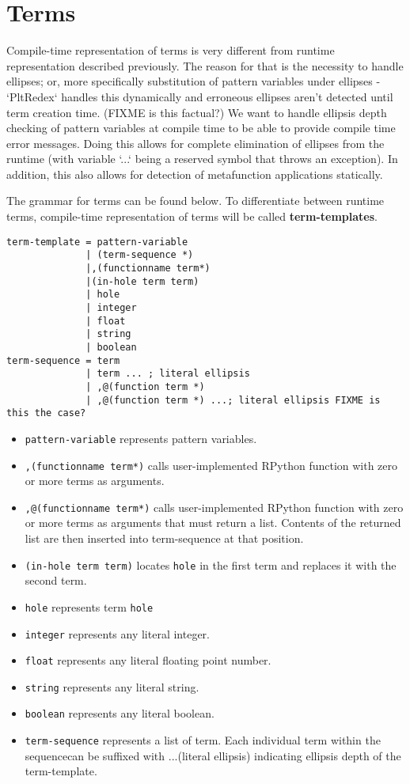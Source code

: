 \section{Terms}

Compile-time representation of terms is very different from runtime representation described previously. The reason for that is the necessity to handle ellipses; or, more specifically substitution of pattern variables under ellipses - `PltRedex` handles this dynamically and erroneous ellipses aren't detected until term creation time.
(FIXME is this factual?)
We want to handle ellipsis depth checking of pattern variables at compile time to be able to provide compile time error messages. Doing this allows for complete elimination of ellipses from the runtime (with variable `...` being a reserved symbol that throws an exception). In addition, this also allows for detection of metafunction applications statically.

The grammar for terms can be found below. To differentiate between runtime terms, compile-time representation of terms will be called \textbf{term-templates}.

\begin{lstlisting}
term-template = pattern-variable 
              | (term-sequence *)
              |,(functionname term*) 
              |(in-hole term term)
              | hole
	          | integer
	          | float
	          | string
	          | boolean 
term-sequence = term
              | term ... ; literal ellipsis
              | ,@(function term *)
              | ,@(function term *) ...; literal ellipsis FIXME is this the case?
\end{lstlisting}

\begin{itemize}
\item 
\lstinline{pattern-variable}  represents pattern variables.
\item
\lstinline{,(functionname term*)} calls user-implemented RPython function with zero or more terms as arguments.
\item
\lstinline{,@(functionname term*)} calls user-implemented RPython function with zero or more terms as arguments that must return a list. Contents of the returned list are then inserted into term-sequence at that position. 
\item
\lstinline{(in-hole term term)} locates \lstinline{hole} in the first term and replaces it with the second term.
\item
\lstinline{hole} represents term \lstinline{hole}
\item
\lstinline{integer} represents any literal integer.
\item
\lstinline{float} represents any literal floating point number.
\item
\lstinline{string}  represents any literal string.
\item
\lstinline{boolean}  represents any literal boolean.
\item
\lstinline{term-sequence} represents a list of term.  Each individual term within the sequencecan be suffixed with ...(literal ellipsis) indicating ellipsis depth of the term-template.
\end{itemize}

